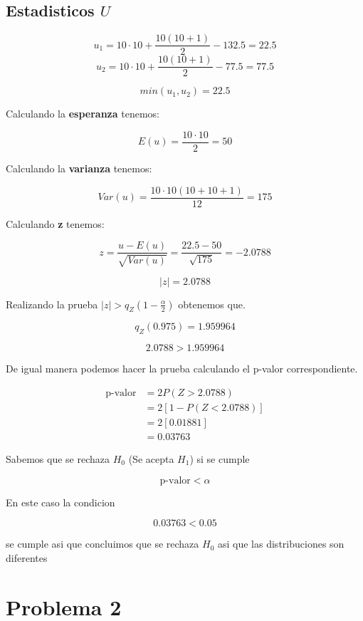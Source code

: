 \documentclass{article}
\begin{document}
\subsection*{Estadisticos $U$}

\[u_1 = 10 \cdot 10 + \frac{10(10+1)}{2} - 132.5 = 22.5\]
\[u_2 = 10 \cdot 10 + \frac{10(10+1)}{2} - 77.5 = 77.5\]

\[min(u_1, u_2) = 22.5\]

Calculando la \textbf{esperanza} tenemos:

\[E(u) = \frac{10 \cdot 10}{2} = 50\]

Calculando la \textbf{varianza} tenemos:

\[Var(u) = \frac{10 \cdot 10(10+10+1)}{12} = 175\]

Calculando \textbf{z} tenemos:

\[z = \frac{u - E(u)}{\sqrt{Var(u)}} = \frac{22.5 - 50}{\sqrt{175}} = -2.0788\]

\[|z| = 2.0788\]

Realizando la prueba \( |z| > q_Z \left(1 - \frac{\alpha}{2} \right) \) obtenemos que.

\[
    q_Z (0.975) = 1.959964
\]

\[
    2.0788 > 1.959964
\]

De igual manera podemos hacer la prueba calculando el p-valor correspondiente.

\begin{align*}
    \text{p-valor} & = 2P(Z > 2.0788)                   \\
                   & = 2 \left[1 - P(Z < 2.0788)\right] \\
                   & = 2 \left[0.01881\right]           \\
                   & = 0.03763
\end{align*}

Sabemos que se rechaza $H_0$ (Se acepta $H_1$) si se cumple

\[\text{p-valor} < \alpha\]

\vspace*{.25cm}

En este caso la condicion

\[0.03763 < 0.05\]

se cumple asi que concluimos que se rechaza $H_0$ asi que las distribuciones son diferentes

\section{Problema 2}
\end{document}
